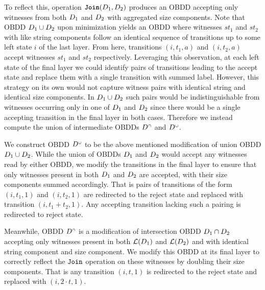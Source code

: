 To reflect this, operation $\texttt{\textbf{Join}}(D_1,D_2) $ produces an OBDD accepting only witnesses from both $D_1$ and $D_2$ with aggregated size components. Note that OBDD $D_1 \cup D_2$ upon minimization yields an OBDD where witnesses $st_1$ and $st_2$ with like string components follow an identical sequence of transitions up to some left state $i$ of the last layer. From here, transitions $(i,t_1,a)$ and $(i,t_2,a)$ accept witnesses $st_1$ and $st_2$ respectively. Leveraging this observation, at each left state of the final layer we could identify pairs of transitions leading to the accept state and replace them with a single transition with summed label. However, this strategy on its own would not capture witness pairs with identical string and identical size components. In $D_1 \cup D_2$ such pairs would be indistinguishable from witnesses occurring only in one of $D_1$ and $D_2$ since there would be a single accepting transition in the final layer in both cases.
Therefore we instead compute the union of intermediate OBDDs $D^{{\scriptscriptstyle\cap}}$ and $D^{{\scriptscriptstyle\cup}}$. 

We construct OBDD $D^{{\scriptscriptstyle\cup}}$ to be the above mentioned modification of union OBDD $D_1 \cup D_2$. While the union of OBDDs $D_1$ and $D_2$ would accept any witnesses read by either OBDD, we modify the transitions in the final layer to ensure that only witnesses present in both $D_1$ and $D_2$ are accepted, with their size components summed accordingly. That is pairs of transitions of the form $(i,t_1,1)$ and $(i,t_2,1)$ are redirected to the reject state and replaced with transition $(i,t_1 +t_2,1)$. Any accepting transition lacking such a pairing is redirected to reject state.

Meanwhile, OBDD $D^{{\scriptscriptstyle\cap}}$ is a modification of intersection OBDD $D_1 \cap D_2$ accepting only witnesses present in both $\mathcal{L}(D_1)$ and $\mathcal{L}(D_2)$ and with identical string component and size component. We modify this OBDD at its final layer to correctly reflect the $\texttt{Join}$ operation on these witnesses by doubling their size components. That is any transition $(i,t,1)$ is redirected to the reject state and replaced with $(i,2\cdot t,1)$.



